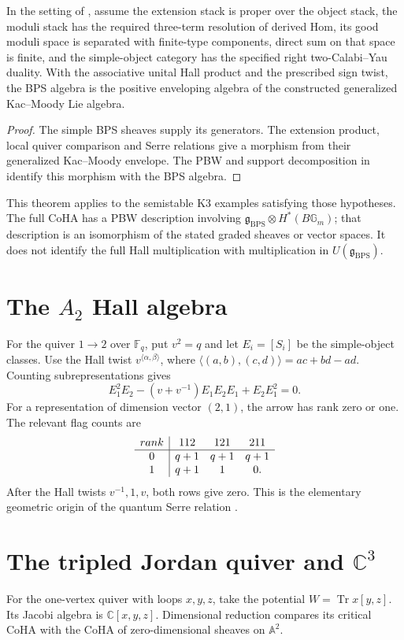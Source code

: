 \begin{theorem}
In the setting of \cite{DHS}, assume the extension stack is proper over
the object stack, the moduli stack has the required three-term
resolution of derived Hom, its good moduli space is separated with
finite-type components, direct sum on that space is finite, and the
simple-object category has the specified right two-Calabi--Yau
duality. With the associative unital Hall product and the prescribed
sign twist, the BPS algebra is the positive enveloping algebra of the
constructed generalized Kac--Moody Lie algebra.
\end{theorem}
\begin{proof}
The simple BPS sheaves supply its generators. The extension product,
local quiver comparison and Serre relations give a morphism from their
generalized Kac--Moody envelope. The PBW and support decomposition in
\cite[Theorems~1.1--1.2]{DHS} identify this morphism with the BPS algebra.
\end{proof}

This theorem applies to the semistable K3 examples satisfying those
hypotheses. The full CoHA has a PBW description involving
$\mathfrak g_{\mathrm{BPS}}\otimes H^*(B\mathbb G_m)$; that description
is an isomorphism of the stated graded sheaves or vector spaces.
It does not identify the full Hall multiplication with multiplication
in $U(\mathfrak g_{\mathrm{BPS}})$.

\section{The \texorpdfstring{$A_2$}{A2} Hall algebra}
For the quiver $1\to2$ over $\mathbb F_q$, put $v^2=q$ and let
$E_i=[S_i]$ be the simple-object classes. Use the Hall twist
$v^{\langle\alpha,\beta\rangle}$, where
$\langle(a,b),(c,d)\rangle=ac+bd-ad$.
Counting subrepresentations gives
\[
 E_1^2E_2-(v+v^{-1})E_1E_2E_1+E_2E_1^2=0.
\]
For a representation of dimension vector $(2,1)$, the arrow has rank zero or one. The relevant flag counts are
\[
\begin{array}{c|ccc}
rank&112&121&211\\ \hline
0&q+1&q+1&q+1\\
1&q+1&1&0.
\end{array}
\]
After the Hall twists $v^{-1},1,v$, both rows give zero. This is the elementary geometric origin of the quantum Serre relation \cite{Ringel,Green}.

\section{The tripled Jordan quiver and \texorpdfstring{$\mathbb C^3$}{C3}}
For the one-vertex quiver with loops $x,y,z$, take the potential
$W=\operatorname{Tr}x[y,z]$. Its Jacobi algebra is $\mathbb C[x,y,z]$.
Dimensional reduction compares its critical CoHA with the CoHA of
zero-dimensional sheaves on $\mathbb A^2$.

